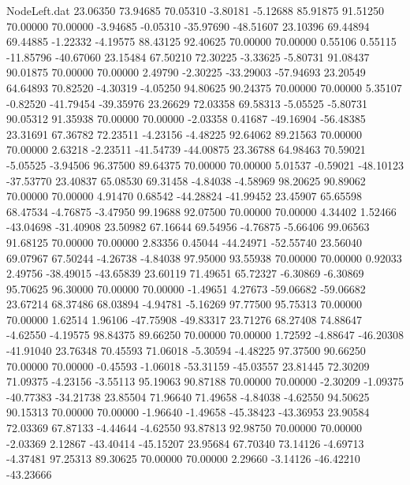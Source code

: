 \begin{filecontents}{NodeLeft.dat}
  23.06350   73.94685   70.05310    -3.80181   -5.12688   85.91875   91.51250   70.00000   70.00000   -3.94685   -0.05310  -35.97690  -48.51607
  23.10396   69.44894   69.44885    -1.22332   -4.19575   88.43125   92.40625   70.00000   70.00000    0.55106    0.55115  -11.85796  -40.67060
  23.15484   67.50210   72.30225    -3.33625   -5.80731   91.08437   90.01875   70.00000   70.00000    2.49790   -2.30225  -33.29003  -57.94693
  23.20549   64.64893   70.82520    -4.30319   -4.05250   94.80625   90.24375   70.00000   70.00000    5.35107   -0.82520  -41.79454  -39.35976
  23.26629   72.03358   69.58313    -5.05525   -5.80731   90.05312   91.35938   70.00000   70.00000   -2.03358    0.41687  -49.16904  -56.48385
  23.31691   67.36782   72.23511    -4.23156   -4.48225   92.64062   89.21563   70.00000   70.00000    2.63218   -2.23511  -41.54739  -44.00875
  23.36788   64.98463   70.59021    -5.05525   -3.94506   96.37500   89.64375   70.00000   70.00000    5.01537   -0.59021  -48.10123  -37.53770
  23.40837   65.08530   69.31458    -4.84038   -4.58969   98.20625   90.89062   70.00000   70.00000    4.91470    0.68542  -44.28824  -41.99452
  23.45907   65.65598   68.47534    -4.76875   -3.47950   99.19688   92.07500   70.00000   70.00000    4.34402    1.52466  -43.04698  -31.40908
  23.50982   67.16644   69.54956    -4.76875   -5.66406   99.06563   91.68125   70.00000   70.00000    2.83356    0.45044  -44.24971  -52.55740
  23.56040   69.07967   67.50244    -4.26738   -4.84038   97.95000   93.55938   70.00000   70.00000    0.92033    2.49756  -38.49015  -43.65839
  23.60119   71.49651   65.72327    -6.30869   -6.30869   95.70625   96.30000   70.00000   70.00000   -1.49651    4.27673  -59.06682  -59.06682
  23.67214   68.37486   68.03894    -4.94781   -5.16269   97.77500   95.75313   70.00000   70.00000    1.62514    1.96106  -47.75908  -49.83317
  23.71276   68.27408   74.88647    -4.62550   -4.19575   98.84375   89.66250   70.00000   70.00000    1.72592   -4.88647  -46.20308  -41.91040
  23.76348   70.45593   71.06018    -5.30594   -4.48225   97.37500   90.66250   70.00000   70.00000   -0.45593   -1.06018  -53.31159  -45.03557
  23.81445   72.30209   71.09375    -4.23156   -3.55113   95.19063   90.87188   70.00000   70.00000   -2.30209   -1.09375  -40.77383  -34.21738
  23.85504   71.96640   71.49658    -4.84038   -4.62550   94.50625   90.15313   70.00000   70.00000   -1.96640   -1.49658  -45.38423  -43.36953
  23.90584   72.03369   67.87133    -4.44644   -4.62550   93.87813   92.98750   70.00000   70.00000   -2.03369    2.12867  -43.40414  -45.15207
  23.95684   67.70340   73.14126    -4.69713   -4.37481   97.25313   89.30625   70.00000   70.00000    2.29660   -3.14126  -46.42210  -43.23666

\end{filecontents}
